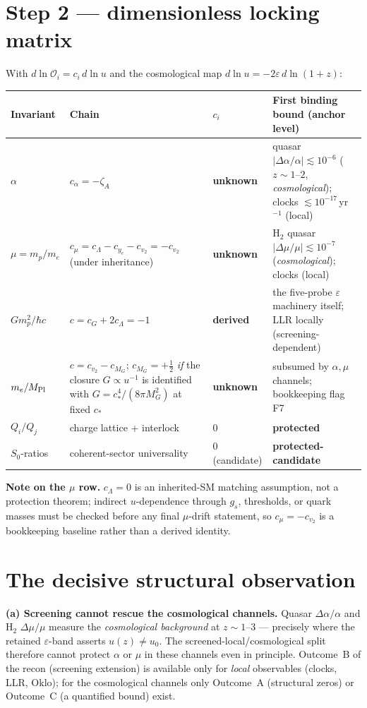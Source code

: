 \documentclass[11pt,a4paper]{article}
\begin{document}
\section{Step 2 --- dimensionless locking matrix}
With $d\ln\mathcal O_i=c_i\,d\ln u$ and the cosmological map
$d\ln u=-2\varepsilon\,d\ln(1+z)$:

\renewcommand{\arraystretch}{1.18}\small
\begin{longtable}{@{}p{2.5cm}p{4.6cm}p{2.2cm}p{5.0cm}@{}}
\toprule \textbf{Invariant} & \textbf{Chain} & \textbf{$c_i$} &
\textbf{First binding bound (anchor level)} \\ \midrule \endhead
\bottomrule \endfoot
$\alpha$ & $c_\alpha=-\zeta_A$ & \textbf{unknown} & quasar
$|\Delta\alpha/\alpha|\lesssim10^{-6}$ ($z\sim1$--$2$, \emph{cosmological});
clocks $\lesssim10^{-17}$\,yr$^{-1}$ (local) \\
$\mu=m_p/m_e$ & $c_\mu=c_\Lambda-c_{y_e}-c_{v_2}=-c_{v_2}$ (under inheritance) &
\textbf{unknown} & H$_2$ quasar $|\Delta\mu/\mu|\lesssim10^{-7}$
(\emph{cosmological}); clocks (local) \\
$G m_p^2/\hbar c$ & $c=c_G+2c_\Lambda=-1$ & \textbf{derived} & the five-probe
$\varepsilon$ machinery itself; LLR locally (screening-dependent) \\
$m_e/M_{\rm Pl}$ & $c=c_{v_2}-c_{M_G}$; $c_{M_G}=+\tfrac12$ \emph{if} the closure
$G\propto u^{-1}$ is identified with $G=c_*^4/(8\pi M_G^2)$ at fixed $c_*$ &
\textbf{unknown} & subsumed by $\alpha,\mu$ channels; bookkeeping flag F7 \\
$Q_i/Q_j$ & charge lattice + interlock & $0$ & \textbf{protected} \\
$S_0$-ratios & coherent-sector universality & $0$ (candidate) &
\textbf{protected-candidate} \\
\end{longtable}\normalsize

\textbf{Note on the $\mu$ row.} $c_\Lambda=0$ is an inherited-SM matching
assumption, not a protection theorem; indirect $u$-dependence through $g_s$,
thresholds, or quark masses must be checked before any final $\mu$-drift statement,
so $c_\mu=-c_{v_2}$ is a bookkeeping baseline rather than a derived identity.

\section{The decisive structural observation}
\textbf{(a) Screening cannot rescue the cosmological channels.} Quasar
$\Delta\alpha/\alpha$ and H$_2$ $\Delta\mu/\mu$ measure the \emph{cosmological
background} at $z\sim1$--$3$ --- precisely where the retained $\varepsilon$-band
asserts $u(z)\neq u_0$. The screened-local/cosmological split therefore cannot
protect $\alpha$ or $\mu$ in these channels even in principle. Outcome~B of the
recon (screening extension) is available only for \emph{local} observables (clocks,
LLR, Oklo); for the cosmological channels only Outcome~A (structural zeros) or
Outcome~C (a quantified bound) exist.
\end{document}
